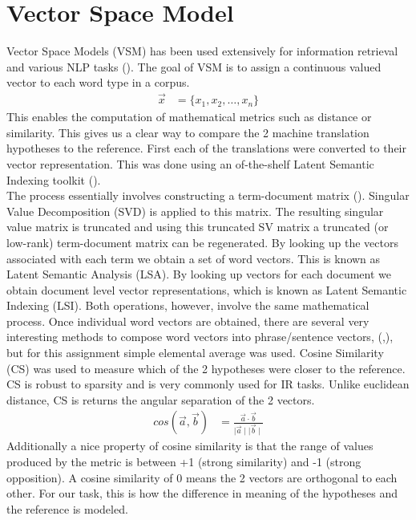 \documentclass[11pt]{article}
\begin{document}
\section{Vector Space Model}
Vector Space Models (VSM) has been used extensively for information retrieval
and various NLP tasks (\cite{Manning:2008:IIR:1394399}). The goal of VSM is to
assign a continuous valued vector to each word type in a corpus.\\
\begin{align*}                                                                                                                                                                   
\vec{x} &= \{ x_1, x_2, \ldots, x_n\}
\end{align*}
 This enables the computation of mathematical metrics such as distance or
 similarity. This gives us a clear way to compare the 2 machine translation
 hypotheses to the reference. First each of the translations were converted to
 their vector representation. This was done using an of-the-shelf Latent
 Semantic Indexing toolkit (\cite{rehurek_lrec}).\\ The process essentially
 involves constructing a term-document matrix (\cite{turney2010frequency}).
 Singular Value Decomposition (SVD) is applied to this matrix. The resulting singular value matrix is
 truncated and using this truncated SV matrix a truncated (or low-rank)
 term-document matrix can be regenerated. By looking up the vectors associated
 with each term we obtain a set of word vectors. This is known as Latent
 Semantic Analysis (LSA). By looking up vectors for each document we obtain
 document level vector representations, which is known as Latent Semantic
 Indexing (LSI). Both operations, however, involve the same mathematical
 process. Once individual word vectors are obtained, there are several very
 interesting methods to compose word vectors into phrase/sentence vectors,
 (\cite{hermann2013role},\cite{socher2012semantic}), but for this assignment
 simple elemental average was used. Cosine Similarity (CS) was used to measure which of the 2 hypotheses were closer to the reference. CS is robust to sparsity and is very commonly used for IR tasks. Unlike euclidean distance, CS is returns the angular separation of the 2 vectors.
 \begin{align*}
 cos(\vec{a},\vec{b}) &= \frac{\vec{a}\cdot \vec{b}}{\mid\vec{a}\mid
 \mid\vec{b}\mid}
 \end{align*}
 Additionally a nice property of cosine similarity is that the range of values
 produced by the metric is between +1 (strong similarity) and -1 (strong
 opposition). A cosine similarity of 0 means the 2 vectors are orthogonal to
 each other. For our task, this is how the difference in meaning of the
 hypotheses  and the reference  is modeled.
\end{document}

